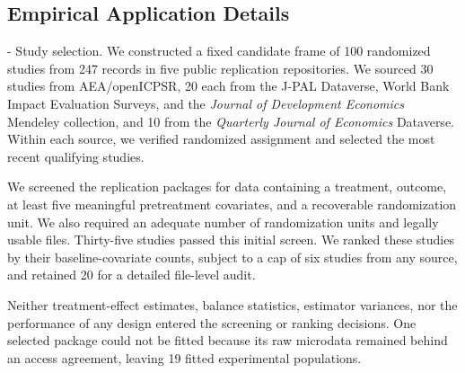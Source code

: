 \documentclass[letterpaper,12pt]{article}
\makeatletter
\theoremstyle{definition}
\numberwithin{equation}{section}
\renewcommand{\paragraph}{\@startsection{paragraph}{4}{\z@}%
  {\medskipamount}%
  {-\fontdimen2\font}%
  {\normalfont\normalsize\bfseries}}
\makeatother
\begin{document}
\subsection{Empirical Application Details}\label{appendix:empirical-application}

\paragraph{Study selection.}
We constructed a fixed candidate frame of 100 randomized studies from 247 records in five public replication repositories.
We sourced 30 studies from AEA/openICPSR, 20 each from the J-PAL Dataverse, World Bank Impact Evaluation Surveys, and the \emph{Journal of Development Economics} Mendeley collection, and 10 from the \emph{Quarterly Journal of Economics} Dataverse.
Within each source, we verified randomized assignment and selected the most recent qualifying studies.

We screened the replication packages for data containing a treatment, outcome, at least five meaningful pretreatment covariates, and a recoverable randomization unit.
We also required an adequate number of randomization units and legally usable files.
Thirty-five studies passed this initial screen.
We ranked these studies by their baseline-covariate counts, subject to a cap of six studies from any source, and retained 20 for a detailed file-level audit.

Neither treatment-effect estimates, balance statistics, estimator variances, nor the performance of any design entered the screening or ranking decisions.
One selected package could not be fitted because its raw microdata remained behind an access agreement, leaving 19 fitted experimental populations.
\end{document}
